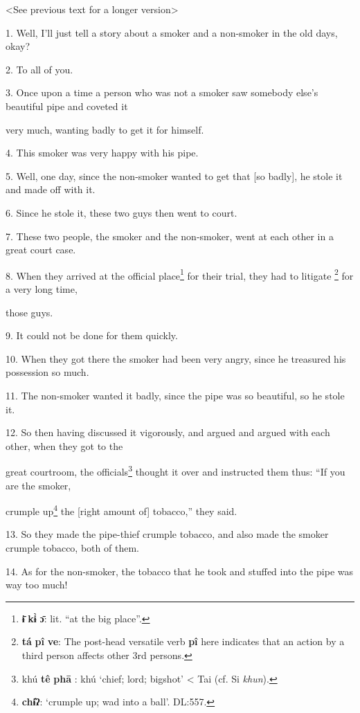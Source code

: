 \setcounter{footnote}{0}

<See previous text for a longer version>

1. Well, I'll just tell a story about a smoker and a non-smoker in the old days,
okay?

2. To all of you.

3. Once upon a time a person who was not a smoker saw somebody else's beautiful
pipe and coveted it

very much, wanting badly to get it for himself.

4. This smoker was very happy with his pipe.

5. Well, one day, since the non-smoker wanted to get that [so badly], he stole
it and made off with it.

6. Since he stole it, these two guys then went to court.

7. These two people, the smoker and the non-smoker, went at each other in a great
court case.

8. When they arrived at the official place\footnote{\textbf{ɨ̄} \textbf{kɨ̀} \textbf{ɔ̄}: lit. ``at the big place''.} for their trial, they had to litigate
\footnote{\textbf{tá} \textbf{pî} \textbf{ve}: The post-head versatile verb \textbf{pî} here indicates that an action by a third person affects other 3rd persons.} for a very long time,

those guys.

9. It could not be done for them quickly.

10. When they got there the smoker had been very angry, since he treasured his
possession so much.

11. The non-smoker wanted it badly, since the pipe was so beautiful, so he stole
it.

12. So then having discussed it vigorously, and argued and argued with each other,
when they got to the

great courtroom, the officials\footnote{khú \textbf{tê} \textbf{phā} : khú `chief; lord; bigshot' < Tai (cf. Si \textit{khun}).} thought it over and instructed them thus: ``If
you are the smoker,

crumple up\footnote{\textbf{chɨ̂ʔ}: `crumple up; wad into a ball'. DL:557.} the [right amount of] tobacco,'' they said.

13. So they made the pipe-thief crumple tobacco, and also made the smoker crumple
tobacco, both of them.

14. As for the non-smoker, the tobacco that he took and stuffed into the pipe was
way too much!

